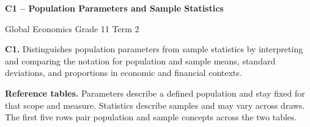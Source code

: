 \makeatletter
{}
\makeatother


\geometry{letterpaper,hmargin=0.25in,vmargin=0.2in}
\newif\ifprintsolutions
\printsolutionstrue %
\ifprintsolutions
    
    
\fi

\setlength{\arrayrulewidth}{0.55pt}
\setlength{\extrarowheight}{3pt}

\newcommand{\problemtitle}[2]{%
    \par\addvspace{0.65\baselineskip}%
    {\setlength{\fboxsep}{2pt}%
     \raisebox{0pt}[\dimexpr\height-\fboxsep\relax][\dimexpr\depth-\fboxsep\relax]{%
         \colorbox{black!10}{\textbf{#1. #2}}}}%
    \par\nobreak
}
\newcommand{\task}[2]{\par\textbf{Task #1.} #2\par}

\newcommand{\compareindependent}{%
    What changes, what stays the same, and which differences can you quantify?
    Use appropriate units, including percentage points for differences in proportions.
    Separate changes in sample statistics from what the data establish about the
    population parameters.%
}


\begingroup
\linespread{1.08}\selectfont
\setlength{\parskip}{5pt}

{\centering
    {\Large\bfseries C1 -- Population Parameters and Sample Statistics\par}
    Global Economics \textbar{} Grade 11 \textbar{} Term 2 \par
}

\textbf{C1.} Distinguishes population parameters from sample statistics by interpreting and comparing the notation for population and sample means, standard deviations, and proportions in economic and financial contexts.

\textbf{Reference tables.} Parameters describe a defined population and stay fixed
for that scope and measure. Statistics describe samples and may vary across draws.
The first five rows pair population and sample concepts across the two tables.

